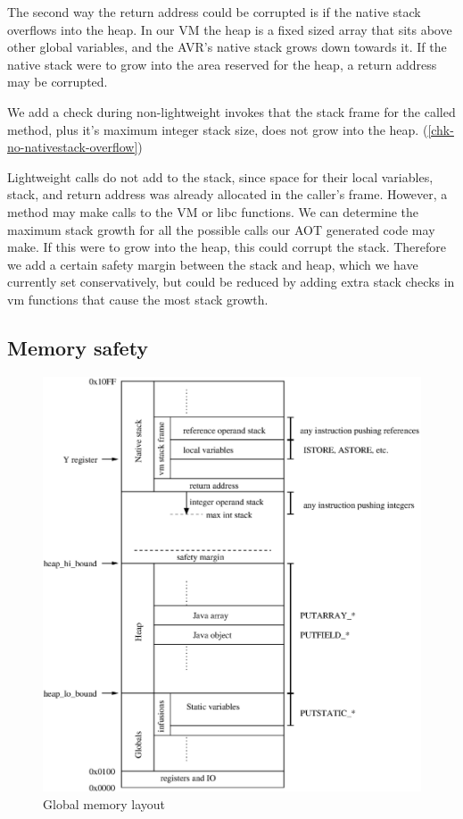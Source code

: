 The second way the return address could be corrupted is if the native stack overflows into the heap. In our VM the heap is a fixed sized array that sits above other global variables, and the AVR's native stack grows down towards it. If the native stack were to grow into the area reserved for the heap, a return address may be corrupted.

We add a check during non-lightweight invokes that the stack frame for the called method, plus it's maximum integer stack size, does not grow into the heap. (\ref{chk-no-nativestack-overflow})

Lightweight calls do not add to the stack, since space for their local variables, stack, and return address was already allocated in the caller's frame. However, a method may make calls to the VM or libc functions. We can determine the maximum stack growth for all the possible calls our AOT generated code may make. If this were to grow into the heap, this could corrupt the stack. Therefore we add a certain safety margin between the stack and heap, which we have currently set conservatively, but could be reduced by adding extra stack checks in vm functions that cause the most stack growth.

\subsection{Memory safety}
\begin{figure}[]
  \includegraphics[width=\linewidth]{memlayout.eps}
  \caption{Global memory layout}
  \label{fig-memlayout}
\end{figure}

